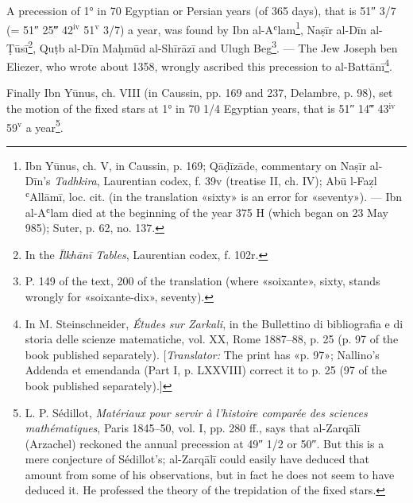 \documentclass[11pt]{article}
\begin{document}
\par A precession of 1° in 70 Egyptian or Persian years (of 365 days), that is 51″ 3/7 (= 51″ 25‴ 42$^{\mathrm{iv}}$ 51$^{\mathrm{v}}$ 3/7) a year, was found by Ibn al-Aʿlam\footnote{Ibn Yūnus, ch. V, in Caussin, p. 169; Qāḍīzāde, commentary on Naṣīr al-Dīn's \emph{Tadhkira}, Laurentian codex, f. 39v (treatise II, ch. IV); Abū l-Faẓl ʿAllāmī, loc. cit. (in the translation «sixty» is an error for «seventy»). — Ibn al-Aʿlam died at the beginning of the year 375 H (which began on 23 May 985); Suter, p. 62, no. 137.}, Naṣīr al-Dīn al-Ṭūsī\footnote{In the \emph{Īlkhānī Tables}, Laurentian codex, f. 102r.}, Quṭb al-Dīn Maḥmūd al-Shīrāzī and Ulugh Beg\footnote{P. 149 of the text, 200 of the translation (where «soixante», sixty, stands wrongly for «soixante-dix», seventy).}. — The Jew Joseph ben Eliezer, who wrote about 1358, wrongly ascribed this precession to al-Battānī\footnote{In M. Steinschneider, \emph{Études sur Zarkali}, in the Bullettino di bibliografia e di storia delle scienze matematiche, vol. XX, Rome 1887–88, p. 25 (p. 97 of the book published separately). [\emph{Translator:} The print has «p. 97»; Nallino's Addenda et emendanda (Part I, p. LXXVIII) correct it to p. 25 (97 of the book published separately).]}.\par
\par Finally Ibn Yūnus, ch. VIII (in Caussin, pp. 169 and 237, Delambre, p. 98), set the motion of the fixed stars at 1° in 70 1/4 Egyptian years, that is 51″ 14‴ 43$^{\mathrm{iv}}$ 59$^{\mathrm{v}}$ a year\footnote{L. P. Sédillot, \emph{Matériaux pour servir à l'histoire comparée des sciences mathématiques}, Paris 1845–50, vol. I, pp. 280 ff., says that al-Zarqālī (Arzachel) reckoned the annual precession at 49″ 1/2 or 50″. But this is a mere conjecture of Sédillot's; al-Zarqālī could easily have deduced that amount from some of his observations, but in fact he does not seem to have deduced it. He professed the theory of the trepidation of the fixed stars.}.\par
\end{document}

